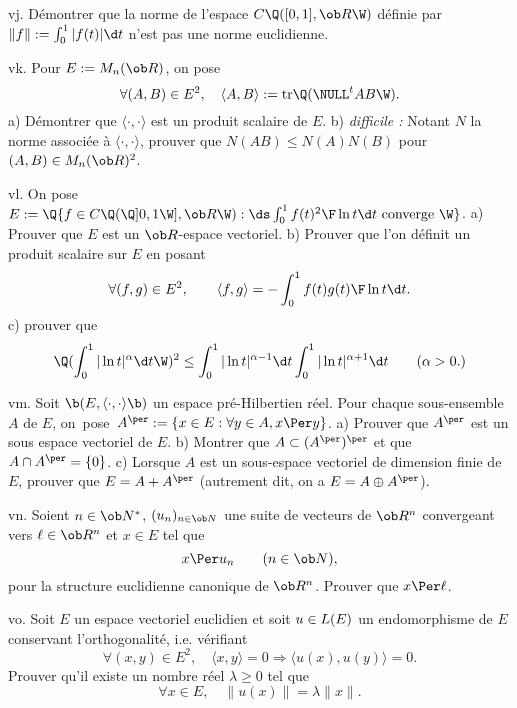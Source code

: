 \exo [Level=2,Fight=2,Learn=1,Field=\EspacesPréHilbertiens,Type=\Exercices,Origin=] vj. 
Démontrer que la norme de l'espace $\sc C\Q([0,1],\ob R\W)$ définie par $\|f\|:=\int_0^1|f(t)|\d t$ 
n'est pas une norme euclidienne. 

\exo [Level=2,Fight=4,Learn=2,Field=\EspacesPréHilbertiens,Type=\Exercices,Origin=] vk. 
Pour $E:=\sc M_n(\ob R)$, on pose 
$$
\forall(A,B)\in E^2,\quad \langle A,B\rangle:=\mbox{\rm tr}\Q(\NULL^tAB\W).
$$
a) Démontrer que $\langle\cdot,\cdot\rangle$ est un produit scalaire de $E$. \pn
b) {\it difficile : }Notant $N$ la norme associée à $\langle\cdot,\cdot\rangle$, prouver que $N(AB)\le N(A)N(B)$ 
pour $(A,B)\in\sc M_n(\ob R)^2$. 


\exo [Level=2,Fight=2,Learn=1,Field=\IntégralesGénéralisées,Type=\Exercices,Origin=] vl. 
On pose $E:=\Q\{f\in\sc C\Q(\Q]0,1\W],\ob R\W):\ds\int_0^1{f(t)^2\F \ln t}\d t\hbox{ converge }\W\}$. \pn
a) Prouver que $E$ est un $\ob R$-espace vectoriel. \pn
b) Prouver que l'on définit un produit scalaire sur $E$ en posant 
$$
\forall (f,g)\in E^2, \qquad\langle f,g\rangle=-\int_0^1{f(t)g(t)\F\ln  t}\d t. 
$$
c) prouver que 
$$
\Q(\int_0^1|\ln t|^\alpha\d t\W)^2\le\int_0^1|\ln t|^{\alpha-1}\d t\int_0^1|\ln t|^{\alpha+1}\d t\qquad(\alpha>0.) 
$$

\exo [Level=2,Fight=1,Learn=2,Field=\EspacesPréHilbertiens,Type=\Cours,Origin=] vm. 
Soit $\b(E,\langle\cdot,\cdot\rangle\b)$ un espace pré-Hilbertien réel. 
Pour chaque sous-ensemble $A$ de $E$, on~pose~$A^{\per}:=\{x\in E:\forall y\in A, x\Per y\}$. 
\pn
a) Prouver que $A^\per$ est un sous espace vectoriel de $E$. \pn
b) Montrer que $A\subset(A^\per)^\per$ et que $A\cap A^\per=\{0\}$. \pn
c) Lorsque $A$ est un sous-espace vectoriel de dimension finie de $E$, 
prouver que $E=A+A^\per$ (autrement dit, on a $E=A\oplus A^\per$). 

\exo [Level=2,Fight=1,Learn=0,Field=\InégalitéDeCauchySchwarz,Type=\Cours,Origin=] vn. 
Soient $n\in\ob N^*$, $(u_n)_{n\in\ob N}$ 
une suite de vecteurs de $\ob R^n$ convergeant vers $\ell\in\ob R^n$ et $x\in E$ tel que 
$$
x\Per u_n\qquad(n\in\ob N),  
$$ 
pour la structure euclidienne canonique de $\ob R^n$. Prouver que $x\Per\ell$. 

\exo [Level=2,Fight=1,Learn=1,Field=\EspacesPréHilbertiens,Type=\Exercices,Origin=] vo. 
Soit $E$ un espace vectoriel euclidien et soit $u\in\sc L(E)$ un endomorphisme de $E$ 
conservant l'orthogonalité, i.e. vérifiant 
$$
\forall (x,y)\in E^2,\quad \langle x,y\rangle=0\Longrightarrow \langle u(x),u(y)\rangle=0. 
$$
Prouver qu'il existe un nombre réel $\lambda\ge0$ tel que 
$$
\forall x\in E, \quad\|u(x)\|=\lambda\|x\|.
$$

